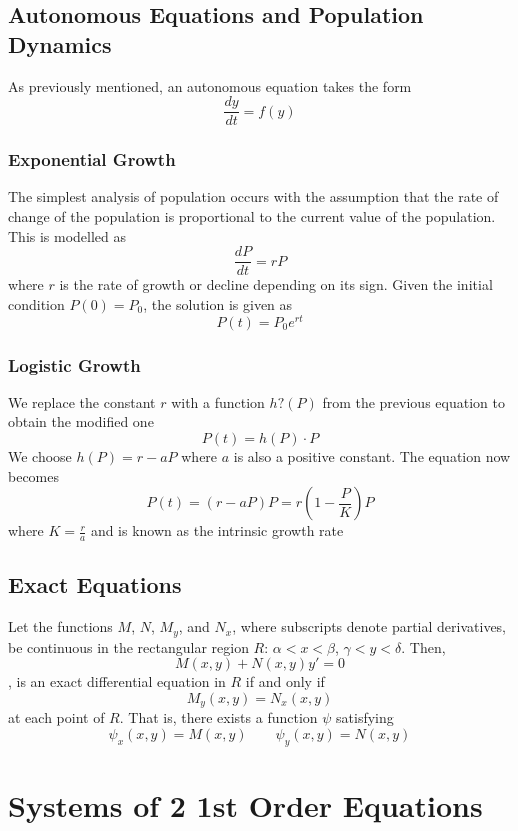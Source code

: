 \documentclass[11pt]{article}
\begin{document}
\subsection{Autonomous Equations and Population Dynamics}
As previously mentioned, an autonomous equation takes the form
$$ \frac{dy}{dt} = f(y)$$
\subsubsection{Exponential Growth}
The simplest analysis of population occurs with the assumption that the rate of change of the population is proportional to the current value of the population. This is modelled as
$$ \frac{dP}{dt} = rP$$ where $r$ is the rate of growth or decline depending on its sign. Given the initial condition $P(0) = P_0$, the solution is given as 
$$ P(t) = P_0e^{rt}$$
\subsubsection{Logistic Growth}
We replace the constant $r$ with a function $h?(P)$ from the previous equation to obtain the modified one 
$$ P(t) = h(P)\cdot P$$
We choose $h(P) = r-aP$ where $a$ is also a positive constant. The equation now becomes
$$P(t) = (r-aP)P = r\left(1-\frac{P}{K}\right) P$$
where $K=\frac{r}{a}$ and is known as the intrinsic growth rate

\subsection{Exact Equations}
Let the functions $M$, $N$, $M_y$, and $N_x$, where subscripts denote partial derivatives, be continuous in the rectangular  region $R$: $\alpha < x < \beta$, $\gamma < y < \delta$. Then, $$M(x,y)+N(x,y)y' = 0$$ , is an exact differential equation in $R$ if and only if $$M_y(x,y)=N_x(x,y)$$ at each point of $R$. That is, there exists a function $\psi$ satisfying $$\psi_ x(x,y)=M(x,y) \quad \quad \psi_y(x,y)=N(x,y)$$ 

\pagebreak

\section{Systems of 2 1st Order Equations}
\end{document}
